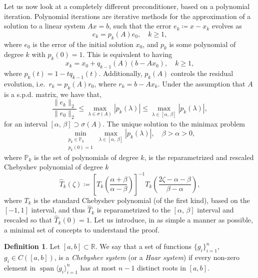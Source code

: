 \documentclass[a4paper]{article}
\newcommand{\norm}[1]{\lVert#1\rVert}
\DeclareMathOperator{\spn}{span}
\theoremstyle{plain}
\theoremstyle{definition}
\newtheorem{definition}{Definition}[section]
\theoremstyle{remark}
\begin{document}
Let us now look at a completely different preconditioner, based on a polynomial iteration. Polynomial iterations are iterative methods for the approximation of a solution to a linear system \(Ax = b\), such that the error \(e_k \coloneqq x - x_k\) evolves as
\begin{equation*}
	e_k = p_k(A) e_0, \quad k \geq 1,
\end{equation*}
where \(e_0\) is the error of the initial solution \(x_0\), and \(p_k\) is some polynomial of degree \(k\) with \(p_k(0) = 1\). This is equivalent to having
\begin{equation}\label{eq:polynomial_iteration_x}
	x_k = x_0 + q_{k-1}(A) (b - A x_0), \quad k \geq 1,
\end{equation}
where \(p_k(t) = 1 - t q_{k-1}(t)\). Additionally, \(p_k(A)\) controls the residual evolution, i.e.\ \(r_k = p_k(A) r_0\), where \(r_k = b - A x_k\). Under the assumption that \(A\) is a s.p.d. matrix, we have that,
\begin{equation*}
	\frac{\norm{e_k}_2}{\norm{e_0}_2} \leq \max_{\lambda\in \sigma(A)} |p_k(\lambda)| \leq \max_{\lambda\in [\alpha,\, \beta]} |p_k(\lambda)|,
\end{equation*}
for an interval \([\alpha,\, \beta] \supset \sigma(A)\). The unique solution to the minimax problem
\begin{equation}\label{eq:chebyshev_minimization}
	\min_{\substack{p_k \in \mathbb{P}_k\\ p_k(0) = 1}} \max_{\lambda\in [\alpha,\, \beta]} |p_k(\lambda)|, \quad \beta > \alpha > 0,
\end{equation}
where \(\mathbb{P}_k\) is the set of polynomials of degree \(k\), is the reparametrized and rescaled Chebyshev polynomial of degree \(k\)
\begin{equation}\label{eq:chebyshev_1st_kind}
	\hat{T}_k(\zeta) \coloneqq \left[T_k\left(\frac{\alpha + \beta}{\alpha - \beta}\right)\right]^{-1} T_k\left(\frac{2\zeta - \alpha - \beta}{\beta - \alpha}\right),
\end{equation}
where \(T_k\) is the standard Chebyshev polynomial (of the first kind), based on the \([-1, 1]\) interval, and thus \(\hat{T}_k\) is reparametrized to the \([\alpha,\, \beta]\) interval and rescaled so that \(\hat{T}_k(0) = 1\). Let us introduce, in as simple a manner as possible, a minimal set of concepts to understand the proof.

\begin{definition}
	Let \([a, b] \subset \mathbb{R}\). We say that a set of functions \(\{g_i\}_{i=1}^n\), \(g_i \in C([a, b])\), is a \emph{Chebyshev system} (or a \emph{Haar system}) if every non-zero element in \(\spn\langle g_i \rangle_{i=1}^n\) has at most \(n - 1\) distinct roots in \([a, b]\).
\end{definition}
\end{document}
